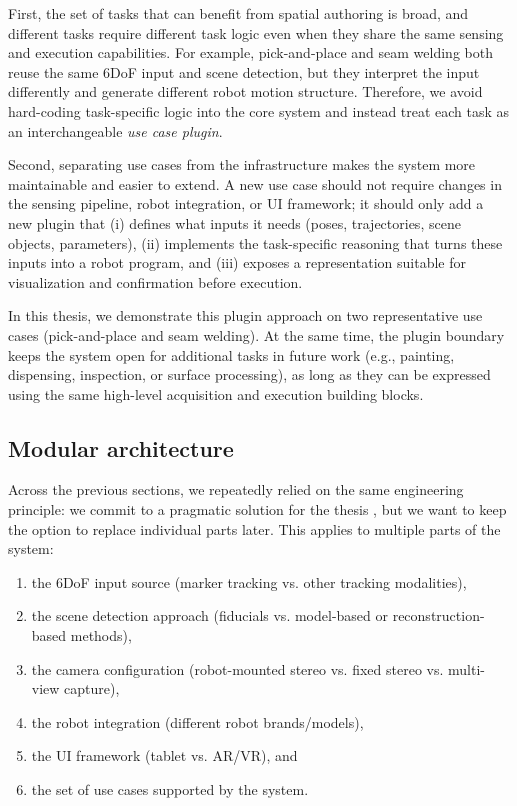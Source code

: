 First, the set of tasks that can benefit from spatial authoring is broad, and different tasks require different task logic even when they share the same sensing and execution capabilities. For example, pick-and-place and seam welding both reuse the same 6DoF input and scene detection, but they interpret the input differently and generate different robot motion structure. Therefore, we avoid hard-coding task-specific logic into the core system and instead treat each task as an interchangeable \emph{use case plugin}.

Second, separating use cases from the infrastructure makes the system more maintainable and easier to extend. A new use case should not require changes in the sensing pipeline, robot integration, or UI framework; it should only add a new plugin that (i) defines what inputs it needs (poses, trajectories, scene objects, parameters), (ii) implements the task-specific reasoning that turns these inputs into a robot program, and (iii) exposes a representation suitable for visualization and confirmation before execution.

In this thesis, we demonstrate this plugin approach on two representative use cases (pick-and-place and seam welding). At the same time, the plugin boundary keeps the system open for additional tasks in future work (e.g., painting, dispensing, inspection, or surface processing), as long as they can be expressed using the same high-level acquisition and execution building blocks.


\subsection{Modular architecture} \label{subsec:ch2_analysis_modular_architecture}

Across the previous sections, we repeatedly relied on the same engineering principle: we commit to a pragmatic solution for the thesis \DIFdelbegin {}\DIFdelend \DIFaddbegin {}\DIFaddend , but we want to keep the option to replace individual parts later. This applies to multiple parts of the system:
\begin{enumerate}[label=(\roman*), itemsep=0.2em]
    \item the 6DoF input source (marker tracking vs. other tracking modalities),
    \item the scene detection approach (fiducials vs. model-based or reconstruction-based methods),
    \item the camera configuration (robot-mounted stereo vs. fixed stereo vs. multi-view capture),
    \item the robot integration (different robot brands/models),
    \item the UI framework (tablet vs. AR/VR), and
    \item the set of use cases supported by the system.
\end{enumerate}

